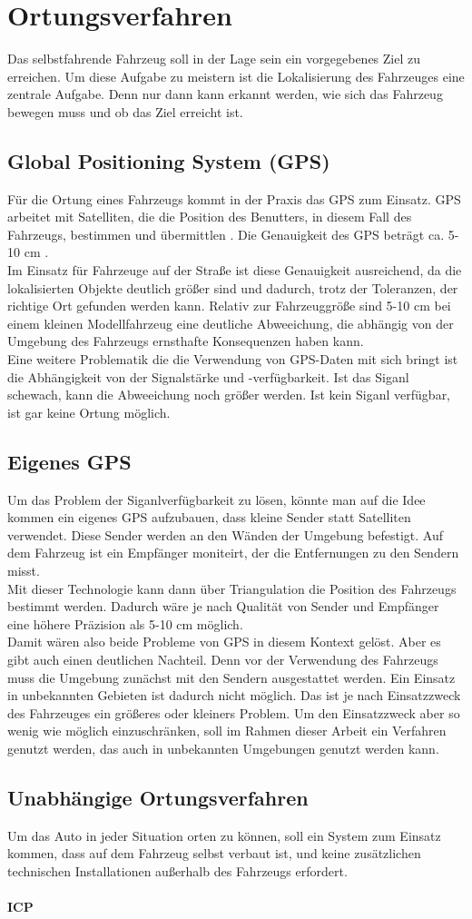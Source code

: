 \section{Ortungsverfahren}
Das selbstfahrende Fahrzeug soll in der Lage sein ein vorgegebenes Ziel zu erreichen. 
Um diese Aufgabe zu meistern ist die Lokalisierung des Fahrzeuges eine zentrale Aufgabe. Denn nur dann kann erkannt werden, wie sich das Fahrzeug bewegen muss
und ob das Ziel erreicht ist.
\subsection{Global Positioning System (GPS)}
Für die Ortung eines Fahrzeugs kommt in der Praxis das GPS zum Einsatz. GPS arbeitet mit Satelliten, die die Position des Benutters, in diesem Fall des Fahrzeugs, bestimmen
und übermittlen \cite{ashby2003relativity}. Die Genauigkeit des GPS beträgt ca. 5-10 cm \cite{ashby2003relativity}. \\
Im Einsatz für Fahrzeuge auf der Straße ist diese Genauigkeit ausreichend, da die lokalisierten Objekte deutlich größer sind und dadurch, trotz der Toleranzen, der richtige Ort gefunden werden kann.
Relativ zur Fahrzeuggröße sind 5-10 cm bei einem kleinen Modellfahrzeug eine deutliche Abweeichung, die abhängig von der Umgebung des Fahrzeugs ernsthafte Konsequenzen haben kann. \\
Eine weitere Problematik die die Verwendung von GPS-Daten mit sich bringt ist die Abhängigkeit von der Signalstärke und -verfügbarkeit. Ist das Siganl schewach, kann die Abweeichung noch größer werden. Ist kein Siganl
verfügbar, ist gar keine Ortung möglich.
\subsection{Eigenes GPS}
Um das Problem der Siganlverfügbarkeit zu lösen, könnte man auf die Idee kommen ein eigenes GPS aufzubauen, dass kleine Sender statt Satelliten verwendet. 
Diese Sender werden an den Wänden der Umgebung befestigt. Auf dem Fahrzeug ist ein Empfänger moniteirt, der die Entfernungen zu den Sendern misst.\\
Mit dieser Technologie kann dann über Triangulation die Position des Fahrzeugs bestimmt werden. Dadurch wäre je nach Qualität von Sender und Empfänger eine höhere Präzision als 
5-10 cm möglich. \\
Damit wären also beide Probleme von GPS in diesem Kontext gelöst. Aber es gibt auch einen deutlichen Nachteil. Denn vor der Verwendung des Fahrzeugs muss die Umgebung zunächst
mit den Sendern ausgestattet werden. Ein Einsatz in unbekannten Gebieten ist dadurch nicht möglich. Das ist je nach Einsatzzweck des Fahrzeuges ein größeres oder kleiners Problem.
Um den Einsatzzweck aber so wenig wie möglich einzuschränken, soll im Rahmen dieser Arbeit ein Verfahren genutzt werden, das auch in unbekannten Umgebungen genutzt werden kann.
\subsection{Unabhängige Ortungsverfahren}
Um das Auto in jeder Situation orten zu können, soll ein System zum Einsatz kommen, dass auf dem Fahrzeug selbst verbaut ist, und keine zusätzlichen technischen Installationen außerhalb des Fahrzeugs erfordert.\\
\paragraph{ICP}
